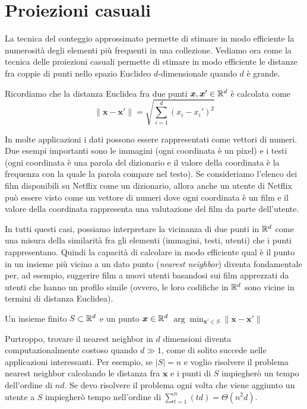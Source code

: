\section{Proiezioni casuali}

La tecnica del conteggio approssimato permette di stimare in modo efficiente la numerosità degli elementi più frequenti in una collezione. Vediamo ora come la tecnica delle proiezioni casuali permette di stimare in modo efficiente le distanze fra coppie di punti nello spazio Euclideo $d$-dimensionale quando $d$ è grande.

Ricordiamo che la distanza Euclidea fra due punti $\bm x, \bm x' \in \mathbb{R}^d$ è calcolata come
$$ \| \bm x - \bm x' \| = \sqrt{\sum_{i = 1}^d \left(x_i - x_i'\right)^2} $$

In molte applicazioni i dati possono essere rappresentati come vettori di numeri. Due esempi importanti sono le immagini (ogni coordinata è un pixel) e i testi (ogni coordinata è una parola del dizionario e il valore della coordinata è la frequenza con la quale la parola compare nel testo). Se consideriamo l'elenco dei film disponibili su Netflix come un dizionario, allora anche un utente di Netflix può essere visto come un vettore di numeri dove ogni coordinata è un film e il valore della coordinata rappresenta una valutazione del film da parte dell'utente.

In tutti questi casi, possiamo interpretare la vicinanza di due punti in $\mathbb{R}^d$ come una misura della similarità fra gli elementi (immagini, testi, utenti) che i punti rappresentano. Quindi la capacità di calcolare in modo efficiente qual è il punto in un insieme più vicino a un dato punto (\textit{nearest neighbor}) diventa fondamentale per, ad esempio, suggerire film a nuovi utenti basandosi sui film apprezzati da utenti che hanno un profilo simile (ovvero, le loro codifiche in $\mathbb{R}^d$ sono vicine in termini di distanza Euclidea).

{Un insieme finito $S \subset \mathbb{R}^d$ e un punto $\bm x \in \mathbb{R}^d$}
{ $\arg \min_{\bm x' \in S} \|\bm x - \bm x' \|$ }

Purtroppo, trovare il nearest neighbor in $d$ dimensioni diventa computazionalmente costoso quando $d \gg 1$, come di solito succede nelle applicazioni interessanti. Per esempio, se $|S| = n$ e voglio risolvere il problema nearest neighbor calcolando le distanza fra $\bm x$ e i punti di $S$ impiegherò un tempo dell'ordine di $nd$. Se devo risolvere il problema ogni volta che viene aggiunto un utente a $S$ impiegherò tempo nell'ordine di $\sum_{t = 1}^n (td) = \Theta(n^2d)$.

